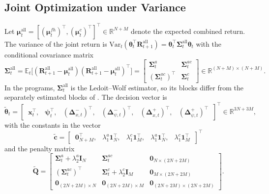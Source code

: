 \subsection{Joint Optimization under Variance} \label{app:mv_var_joint}

Let $\bm{\mu}^{\text{all}}_t = [(\bm{\mu}^{fh}_t)^\top, (\bm{\mu}^c_t)^\top]^\top \in \mathbb{R}^{N+M}$ denote the
expected combined return. The variance of the joint return is
$\text{Var}_t(\bm{\theta}_t^\top \bm{R}^{\text{all}}_{t+1}) = \bm{\theta}_t^\top \bm{\Sigma}^{\text{all}}_t \bm{\theta}_t$
with the conditional covariance matrix
\begin{equation*}
    \bm{\Sigma}^{\text{all}}_t
    = \mathbb{E}_t\bigl[ (\bm{R}^{\text{all}}_{t+1} - \bm{\mu}^{\text{all}}_t)
    (\bm{R}^{\text{all}}_{t+1} - \bm{\mu}^{\text{all}}_t)^\top \bigr]
    = \begin{bmatrix} \bm{\Sigma}^a_t & \bm{\Sigma}^{ac}_t \\ (\bm{\Sigma}^{ac}_t)^\top & \bm{\Sigma}^c_t \end{bmatrix}
    \in \mathbb{R}^{(N+M) \times (N+M)}.
\end{equation*}
In the programs, $\bm{\Sigma}^{\text{all}}_t$ is the Ledoit--Wolf estimator, so its blocks differ from the separately
estimated blocks of . The decision vector is
\begin{equation*}
    \tilde{\bm{\theta}}_t = \begin{bmatrix}\, \bm{x}_t^\top,& \bm{\psi}_t^\top,&
    (\bm{\Delta}_{x,t}^-)^\top,& (\bm{\Delta}_{\psi,t}^-)^\top,&
    (\bm{\Delta}_{x,t}^+)^\top,& (\bm{\Delta}_{\psi,t}^+)^\top \,\end{bmatrix}^\top
    \in \mathbb{R}^{3N+3M},
\end{equation*}
with the constants in the vector
\begin{equation*}
    \tilde{\bm{c}} = \begin{bmatrix}\, \bm{0}_{N+M}^\top,&
    \lambda_1^a \bm{1}_N^\top,& \lambda_1^c \bm{1}_M^\top,&
    \lambda_1^a \bm{1}_N^\top,& \lambda_1^c \bm{1}_M^\top \,\end{bmatrix}^\top
\end{equation*}
and the penalty matrix
\begin{equation*}
    \tilde{\bm{Q}} =
    \begin{bmatrix}
        \bm{\Sigma}^a_t + \lambda_2^a \bm{I}_N & \bm{\Sigma}^{ac}_t & \bm{0}_{N\times(2N + 2M)} \\
        (\bm{\Sigma}^{ac}_t)^\top & \bm{\Sigma}^c_t + \lambda_2^c \bm{I}_M & \bm{0}_{M\times(2N + 2M)} \\
        \bm{0}_{(2N+2M) \times N} & \bm{0}_{(2N+2M) \times M} & \bm{0}_{(2N+2M) \times (2N+2M)}
    \end{bmatrix}.
\end{equation*}
